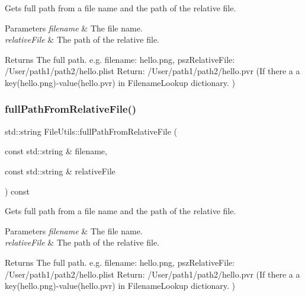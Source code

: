 Gets full path from a file name and the path of the relative file. 
\begin{DoxyParams}{Parameters}
{\em filename} & The file name. \\
\hline
{\em relative\+File} & The path of the relative file. \\
\hline
\end{DoxyParams}
\begin{DoxyReturn}{Returns}
The full path. e.\+g. filename\+: hello.\+png, psz\+Relative\+File\+: /\+User/path1/path2/hello.plist Return\+: /\+User/path1/path2/hello.pvr (If there a a key(hello.\+png)-\/value(hello.\+pvr) in Filename\+Lookup dictionary. ) 
\end{DoxyReturn}
\mbox{\label{classFileUtils_abc1dbf1656599ede5f15347c3fcedb85}} 
\subsubsection{\texorpdfstring{full\+Path\+From\+Relative\+File()}{fullPathFromRelativeFile()}\hspace{0.1cm}{\footnotesize\ttfamily [2/2]}}
{\footnotesize\ttfamily std\+::string File\+Utils\+::full\+Path\+From\+Relative\+File (\begin{DoxyParamCaption}\item[{const std\+::string \&}]{filename,  }\item[{const std\+::string \&}]{relative\+File }\end{DoxyParamCaption}) const\hspace{0.3cm}{\ttfamily [virtual]}}

Gets full path from a file name and the path of the relative file. 
\begin{DoxyParams}{Parameters}
{\em filename} & The file name. \\
\hline
{\em relative\+File} & The path of the relative file. \\
\hline
\end{DoxyParams}
\begin{DoxyReturn}{Returns}
The full path. e.\+g. filename\+: hello.\+png, psz\+Relative\+File\+: /\+User/path1/path2/hello.plist Return\+: /\+User/path1/path2/hello.pvr (If there a a key(hello.\+png)-\/value(hello.\+pvr) in Filename\+Lookup dictionary. ) 
\end{DoxyReturn}
\mbox{\label{classFileUtils_a4e9cd9c1ab62bf30f42a423df06016b8}} 
